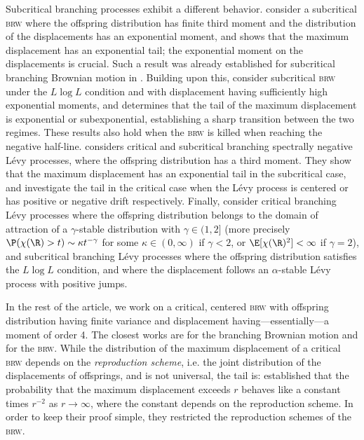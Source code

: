 \documentclass[10pt,a4paper]{article}
\newcommand{\brw}{\textsc{brw}\xspace}
\newcommand{\repscheme}{reproduction scheme\xspace}
\newcommand{\repschemes}{reproduction schemes\xspace}
\begin{document}
Subcritical branching processes exhibit a different behavior. 
\cite{neuman2017maximal} consider a subcritical \brw where the offspring distribution has finite third moment and the distribution of the displacements has an exponential moment, and shows that the maximum displacement has an exponential tail; the exponential moment on the displacements is crucial. Such a result was already established for subcritical branching Brownian motion in \cite{sawyer1979maximum}. Building upon this, 
\cite{hou2025maximal} consider subcritical \brw under the $L \log L$ condition and with displacement having sufficiently high exponential moments, and determines that the tail of the maximum displacement is exponential or subexponential, establishing a sharp transition between the two regimes. These results also hold when the \brw is killed when reaching the negative half-line. 
\cite{profeta2024maximal} considers critical and subcritical branching spectrally negative Lévy processes, where the offspring distribution has a third moment. They show that the maximum displacement has an exponential tail in the subcritical case, and investigate the tail in the critical case when the Lévy process is centered or has positive or negative drift respectively. Finally, \cite{hou2025tailsub} consider critical branching Lévy processes where the offspring distribution belongs to the domain of attraction of a $\gamma$-stable distribution with $\gamma\in (1,2]$ (more precisely $\P(\chi(\R)>t)\sim \kappa t^{-\gamma}$ for some $\kappa\in (0,\infty)$ if $\gamma<2$, or $\E[\chi(\R)^2]<\infty$ if $\gamma=2$), and subcritical branching Lévy processes where the offspring distribution satisfies the $L \log L$ condition, and where the displacement follows an $\alpha$-stable Lévy process with positive jumps. 

In the rest of the article, we work on a critical, centered \brw with offspring distribution having finite variance and displacement having---essentially---a moment of order 4. The closest works are \cite{sawyer1979maximum} for the branching Brownian motion and \cite{lalley2015maximal} for the \brw. %
%
While the distribution of the maximum displacement of a critical \brw depends on the \emph{reproduction scheme}, i.e. the joint distribution of the displacements of offsprings, and is not universal, the tail is: \cite{lalley2015maximal} established that the probability that the maximum displacement exceeds $r$ behaves like a constant times $r^{-2}$ as $r\to\infty$, where the constant depends on the \repscheme. In order to keep their proof simple, they restricted the \repschemes of the \brw. 
\end{document}
